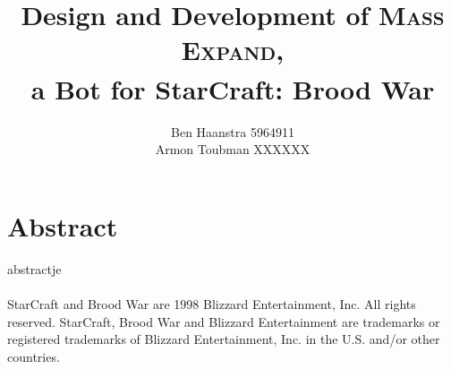 \documentclass[11pt,a4paper,oneside]{book} %
\title{\huge Design and Development of \textsc{Mass Expand},\\ a Bot for StarCraft\textsuperscript{\small \textregistered}: Brood War\textsuperscript{\small \textregistered}}
\author{Ben Haanstra 5964911\\
Armon Toubman XXXXXX}
\begin{document}
\maketitle






\chapter*{\centering Abstract}
abstractje
\\
\\


\noindent{}StarCraft and Brood War are \textcopyright{}1998 Blizzard Entertainment, Inc. All rights reserved. StarCraft, Brood War and Blizzard Entertainment are trademarks or registered trademarks of Blizzard Entertainment, Inc. in the U.S. and/or other countries.
\pagestyle{empty}
\clearpage

\frontmatter

\tableofcontents



\mainmatter

\pagestyle{fancy}
















\backmatter


\end{document}
